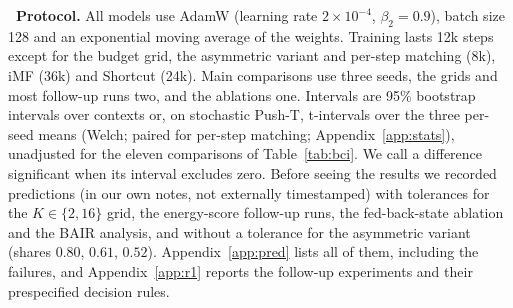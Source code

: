 \leavevmode{}\textbf{\thesubsection\ Protocol.} All models use AdamW (learning rate $2\times10^{-4}$, $\beta_2 = 0.9$), batch size 128 and an exponential moving average of the weights. Training lasts 12k steps except for the budget grid, the asymmetric variant and per-step matching (8k), iMF (36k) and Shortcut (24k). Main comparisons use three seeds, the grids and most follow-up runs two, and the ablations one. Intervals are 95\% bootstrap intervals over contexts or, on stochastic Push-T, t-intervals over the three per-seed means (Welch; paired for per-step matching; Appendix~\ref{app:stats}), unadjusted for the eleven comparisons of Table~\ref{tab:bci}. We call a difference significant when its interval excludes zero. Before seeing the results we recorded predictions (in our own notes, not externally timestamped) with tolerances for the $K \in \{2,16\}$ grid, the energy-score follow-up runs, the fed-back-state ablation and the BAIR analysis, and without a tolerance for the asymmetric variant (shares $0.80$, $0.61$, $0.52$). Appendix~\ref{app:pred} lists all of them, including the failures, and Appendix~\ref{app:r1} reports the follow-up experiments and their prespecified decision rules.
